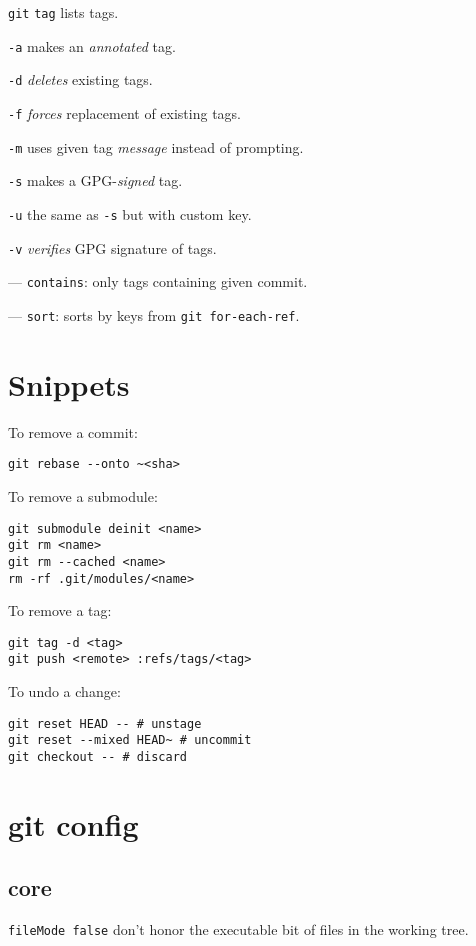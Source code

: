 \documentclass{reference_card}
\begin{document}
\begin{multicols*}{3}
\begin{compactenum}
\item [\texttt{git}] \texttt{tag} lists tags.
\item [\texttt{-a}] makes an \emph{annotated} tag.
\item [\texttt{-d}] \emph{deletes} existing tags.
\item [\texttt{-f}] \emph{forces} replacement of existing tags.
\item [\texttt{-m}] uses given tag \emph{message} instead of prompting.
\item [\texttt{-s}] makes a GPG-\emph{signed} tag.
\item [\texttt{-u}] the same as \texttt{-s} but with custom key.
\item [\texttt{-v}] \emph{verifies} GPG signature of tags.
\item [---] \texttt{contains}: only tags containing given commit.
\item [---] \texttt{sort}: sorts by keys from \texttt{git for-each-ref}.
\end{compactenum}

\section*{Snippets}
To remove a commit:
\begin{verbatim}
git rebase --onto ~<sha>
\end{verbatim}

To remove a submodule:
\begin{verbatim}
git submodule deinit <name>
git rm <name>
git rm --cached <name>
rm -rf .git/modules/<name>
\end{verbatim}

To remove a tag:
\begin{verbatim}
git tag -d <tag>
git push <remote> :refs/tags/<tag>
\end{verbatim}

To undo a change:
\begin{verbatim}
git reset HEAD -- # unstage
git reset --mixed HEAD~ # uncommit
git checkout -- # discard
\end{verbatim}

\section*{git config}
\subsection*{core}
\texttt{fileMode false} don't honor the executable bit of files in the working tree.
\end{multicols*}
\end{document}
